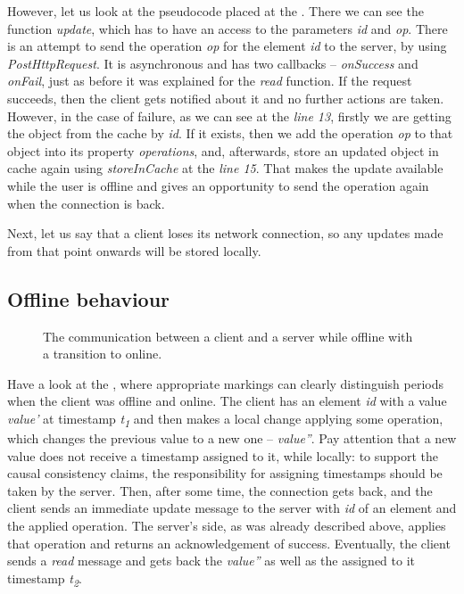 However, let us look at the pseudocode placed at the . There we can see the function \textit{update}, which has to have an access to the parameters \textit{id} and \textit{op}. There is an attempt to send the operation \textit{op} for the element \textit{id} to the server, by using \textit{PostHttpRequest}. It is asynchronous and has two callbacks -- \textit{onSuccess} and \textit{onFail}, just as before it was explained for the \textit{read} function. If the request succeeds, then the client gets notified about it and no further actions are taken. However, in the case of failure, as we can see at the \textit{line 13}, firstly we are getting the object from the cache by \textit{id}. If it exists, then we add the operation \textit{op} to that object into its property \textit{operations}, and, afterwards, store an updated object in cache again using \textit{storeInCache} at the \textit{line 15}. That makes the update available while the user is offline and gives an opportunity to send the operation again when the connection is back.

Next, let us say that a client loses its network connection, so any updates made from that point onwards will be stored locally.  

\subsection*{Offline behaviour}

\begin{figure}[!htb]
    \begin{center}
    \def\svgwidth{\linewidth}
    
    \caption {The communication between a client and a server while offline with a transition to online.}
    \label{fig:design4}
\end{center}
\end{figure}

Have a look at the , where appropriate markings can clearly distinguish periods when the client was offline and online. The client has an element \textit{id} with a value \textit{value'} at timestamp \textit{t\textsubscript{1}} and then makes a local change applying some operation, which changes the previous value to a new one -- \textit{value''}. Pay attention that a new value does not receive a timestamp assigned to it, while locally: to support the causal consistency claims, the responsibility for assigning timestamps should be taken by the server. Then, after some time, the connection gets back, and the client sends an immediate update message to the server with \textit{id} of an element and the applied operation. The server's side, as was already described above, applies that operation and returns an acknowledgement of success. Eventually, the client sends a \textit{read} message and gets back the \textit{value''} as well as the assigned to it timestamp \textit{t\textsubscript{2}}.

